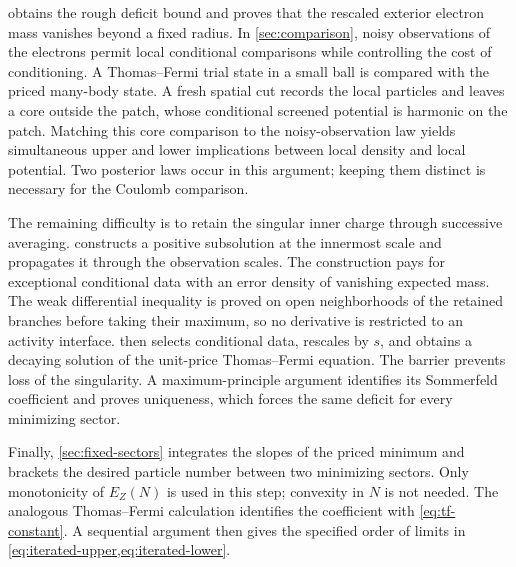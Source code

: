  obtains the rough deficit bound and proves that the
rescaled exterior electron mass vanishes beyond a fixed radius. In
\cref{sec:comparison}, noisy observations of the electrons permit local
conditional comparisons while controlling the cost of conditioning. A
Thomas--Fermi trial state in a small ball is compared with the priced
many-body state. A fresh spatial cut records the local particles and leaves
a core outside the patch, whose conditional screened potential is harmonic
on the patch. Matching this core comparison to the noisy-observation law
yields simultaneous upper and lower implications between local density
and local potential.
Two posterior laws occur in this argument; keeping them distinct is
necessary for the Coulomb comparison.

The remaining difficulty is to retain the singular inner charge through
successive averaging.  constructs a positive subsolution
at the innermost scale and propagates it through the observation scales.
The construction pays for exceptional conditional data with an error
density of vanishing expected mass. The weak differential inequality is
proved on open neighborhoods of the retained branches before taking their
maximum, so no derivative is restricted to an activity interface.
 then selects conditional data, rescales by $s$, and obtains
a decaying solution of the unit-price Thomas--Fermi equation. The barrier
prevents loss of the singularity. A maximum-principle argument identifies
its Sommerfeld coefficient and proves uniqueness, which forces the same
deficit for every minimizing sector.

Finally, \cref{sec:fixed-sectors} integrates the slopes of the priced
minimum and brackets the desired particle number between two minimizing
sectors. Only monotonicity of $E_Z(N)$ is used in this step; convexity in
$N$ is not needed. The analogous Thomas--Fermi calculation identifies the
coefficient with \cref{eq:tf-constant}. A sequential argument then gives
the specified order of limits in
\cref{eq:iterated-upper,eq:iterated-lower}.
